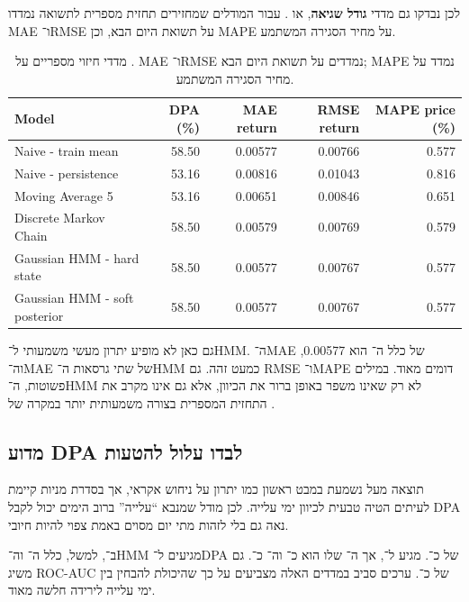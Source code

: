לכן נבדקו גם מדדי \textbf{גודל שגיאה}, או . עבור המודלים שמחזירים תחזית מספרית לתשואה נמדדו MAE ו־RMSE על תשואת היום הבא, וכן MAPE על מחיר הסגירה המשתמע.

\begin{table}[H]
\centering
\small
\begin{english}
\begin{tabular}{l r r r r}
\toprule
Model & DPA (\%) & MAE return & RMSE return & MAPE price (\%) \\
\midrule
Naive - train mean & 58.50 & 0.00577 & 0.00766 & 0.577 \\
Naive - persistence & 53.16 & 0.00816 & 0.01043 & 0.816 \\
Moving Average 5 & 53.16 & 0.00651 & 0.00846 & 0.651 \\
Discrete Markov Chain & 58.50 & 0.00579 & 0.00769 & 0.579 \\
Gaussian HMM - hard state & 58.50 & 0.00577 & 0.00767 & 0.577 \\
Gaussian HMM - soft posterior & 58.50 & 0.00577 & 0.00767 & 0.577 \\
\bottomrule
\end{tabular}
\end{english}
\caption{מדדי חיזוי מספריים על . MAE ו־RMSE נמדדים על תשואת היום הבא; MAPE נמדד על מחיר הסגירה המשתמע.}
\label{tab:spymagnitude}
\end{table}

גם כאן לא מופיע יתרון מעשי משמעותי ל־HMM. ה־MAE של כלל ה־ הוא 0.00577, וה־MAE של שתי גרסאות ה־HMM כמעט זהה. גם RMSE ו־MAPE דומים מאוד. במילים פשוטות, ה־HMM לא רק שאינו משפר באופן ברור את הכיוון, אלא גם אינו מקרב את התחזית המספרית בצורה משמעותית יותר במקרה של .

\subsection{מדוע DPA לבדו עלול להטעות}

תוצאה מעל  נשמעת במבט ראשון כמו יתרון על ניחוש אקראי, אך בסדרת מניות קיימת לעיתים הטיה טבעית לכיוון ימי עלייה. לכן מודל שמנבא ``עלייה'' ברוב הימים יכול לקבל DPA נאה גם בלי לזהות מתי יום מסוים באמת צפוי להיות חיובי.

ב־, למשל, כלל ה־ וה־HMM מגיעים ל־DPA של כ־.  מגיע ל־, אך ה־ שלו הוא כ־ וה־ כ־. גם  משיג ROC-AUC של כ־. ערכים סביב  במדדים האלה מצביעים על כך שהיכולת להבחין בין ימי עלייה לירידה חלשה מאוד.

